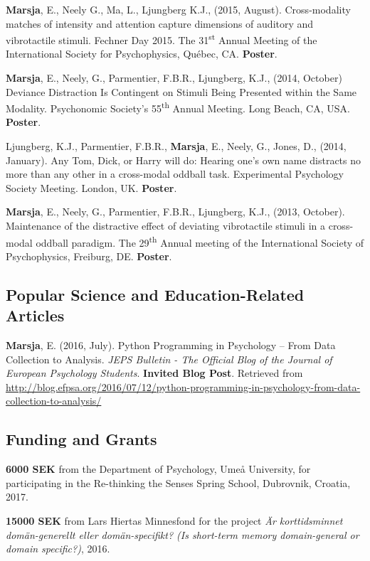 \documentclass[]{article}
\begin{document}
\textbf{Marsja}, E., Neely G., Ma, L., Ljungberg K.J., (2015, August).
Cross-modality matches of intensity and attention capture dimensions of
auditory and vibrotactile stimuli. Fechner Day 2015. The
31\textsuperscript{st} Annual Meeting of the International Society for
Psychophysics, Québec, CA. \textbf{Poster}.

\textbf{Marsja}, E., Neely, G., Parmentier, F.B.R., Ljungberg, K.J.,
(2014, October) Deviance Distraction Is Contingent on Stimuli Being
Presented within the Same Modality. Psychonomic Society's
55\textsuperscript{th} Annual Meeting. Long Beach, CA, USA.
\textbf{Poster}.

Ljungberg, K.J., Parmentier, F.B.R., \textbf{Marsja}, E., Neely, G.,
Jones, D., (2014, January). Any Tom, Dick, or Harry will do: Hearing
one's own name distracts no more than any other in a cross-modal oddball
task. Experimental Psychology Society Meeting. London, UK.
\textbf{Poster}.

\textbf{Marsja}, E., Neely, G., Parmentier, F.B.R., Ljungberg, K.J.,
(2013, October). Maintenance of the distractive effect of deviating
vibrotactile stimuli in a cross-modal oddball paradigm. The
29\textsuperscript{th} Annual meeting of the International Society of
Psychophysics, Freiburg, DE. \textbf{Poster}.

\subsection{Popular Science and Education-Related
Articles}\label{popular-science-and-education-related-articles}

\textbf{Marsja}, E. (2016, July). Python Programming in Psychology --
From Data Collection to Analysis. \emph{JEPS Bulletin - The Official
Blog of the Journal of European Psychology Students}. \textbf{Invited
Blog Post}. Retrieved from \sloppy
\url{http://blog.efpsa.org/2016/07/12/python-programming-in-psychology-from-data-collection-to-analysis/}

\subsection{Funding and Grants}\label{funding-and-grants}

\textbf{6000 SEK} from the Department of Psychology, Umeå University,
for participating in the Re-thinking the Senses Spring School,
Dubrovnik, Croatia, 2017.

\textbf{15000 SEK} from Lars Hiertas Minnesfond for the project \emph{Är
korttidsminnet domän-generellt eller domän-specifikt? (Is short-term
memory domain-general or domain specific?)}, 2016.
\end{document}
